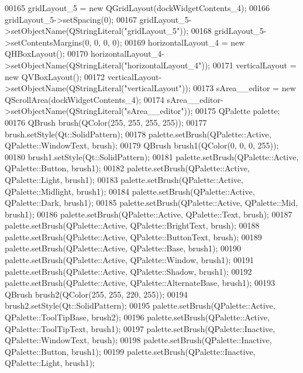 \begin{DoxyCode}
00165         gridLayout\_5 = \textcolor{keyword}{new} QGridLayout(dockWidgetContents\_4);
00166         gridLayout\_5->setSpacing(0);
00167         gridLayout\_5->setObjectName(QStringLiteral(\textcolor{stringliteral}{"gridLayout\_5"}));
00168         gridLayout\_5->setContentsMargins(0, 0, 0, 0);
00169         horizontalLayout\_4 = \textcolor{keyword}{new} QHBoxLayout();
00170         horizontalLayout\_4->setObjectName(QStringLiteral(\textcolor{stringliteral}{"horizontalLayout\_4"}));
00171         verticalLayout = \textcolor{keyword}{new} QVBoxLayout();
00172         verticalLayout->setObjectName(QStringLiteral(\textcolor{stringliteral}{"verticalLayout"}));
00173         sArea\_\_editor = \textcolor{keyword}{new} QScrollArea(dockWidgetContents\_4);
00174         sArea\_\_editor->setObjectName(QStringLiteral(\textcolor{stringliteral}{"sArea\_\_editor"}));
00175         QPalette palette;
00176         QBrush brush(QColor(255, 255, 255, 255));
00177         brush.setStyle(Qt::SolidPattern);
00178         palette.setBrush(QPalette::Active, QPalette::WindowText, brush);
00179         QBrush brush1(QColor(0, 0, 0, 255));
00180         brush1.setStyle(Qt::SolidPattern);
00181         palette.setBrush(QPalette::Active, QPalette::Button, brush1);
00182         palette.setBrush(QPalette::Active, QPalette::Light, brush1);
00183         palette.setBrush(QPalette::Active, QPalette::Midlight, brush1);
00184         palette.setBrush(QPalette::Active, QPalette::Dark, brush1);
00185         palette.setBrush(QPalette::Active, QPalette::Mid, brush1);
00186         palette.setBrush(QPalette::Active, QPalette::Text, brush);
00187         palette.setBrush(QPalette::Active, QPalette::BrightText, brush);
00188         palette.setBrush(QPalette::Active, QPalette::ButtonText, brush);
00189         palette.setBrush(QPalette::Active, QPalette::Base, brush1);
00190         palette.setBrush(QPalette::Active, QPalette::Window, brush1);
00191         palette.setBrush(QPalette::Active, QPalette::Shadow, brush1);
00192         palette.setBrush(QPalette::Active, QPalette::AlternateBase, brush1);
00193         QBrush brush2(QColor(255, 255, 220, 255));
00194         brush2.setStyle(Qt::SolidPattern);
00195         palette.setBrush(QPalette::Active, QPalette::ToolTipBase, brush2);
00196         palette.setBrush(QPalette::Active, QPalette::ToolTipText, brush1);
00197         palette.setBrush(QPalette::Inactive, QPalette::WindowText, brush);
00198         palette.setBrush(QPalette::Inactive, QPalette::Button, brush1);
00199         palette.setBrush(QPalette::Inactive, QPalette::Light, brush1);

\end{DoxyCode}
